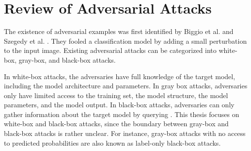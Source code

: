 





\section{Review of Adversarial Attacks}
\label{sec:adv_attack}

The existence of adversarial examples was first identified by Biggio et al. \citep{biggio2013evasion} and Szegedy et al. \citep{szegedy2013intriguing}. They fooled a classification model by adding a small perturbation to the input image. Existing adversarial attacks can be categorized into white-box, gray-box, and black-box attacks. 

In white-box attacks, the adversaries have full knowledge of the target model, including the model architecture and parameters. In gray box attacks, adversaries only have limited access to the training set, the model structure, the model parameters, and the model output. In black-box attacks, adversaries can only gather information about the target model by querying \citep{REN2020346}. This thesis focuses on white-box and black-box attacks, since the boundary between gray-box and black-box attacks is rather unclear. For instance, gray-box attacks with no access to predicted probabilities are also known as label-only black-box attacks.


